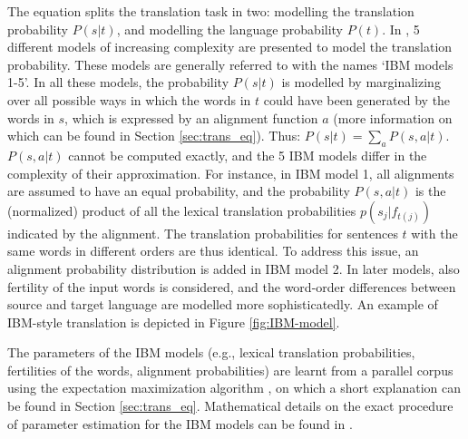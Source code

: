 The equation splits the translation task in two: modelling the translation probability $P(s|t)$, and modelling the language probability $P(t)$. In \cite{brown1993mathematics}, 5 different models of increasing complexity are presented to model the translation probability. These models are generally referred to with the names `IBM models 1-5'. In all these models, the probability $P(s|t)$ is modelled by marginalizing over all possible ways in which the words in $t$ could have been generated by the words in $s$, which is expressed by an alignment function $a$ (more information on which can be found in Section \ref{sec:trans_eq}). Thus: $P(s|t) = \sum_a P(s,a|t)$. $P(s,a|t)$ cannot be computed exactly, and the 5 IBM models differ in the complexity of their approximation. For instance, in IBM model 1, all alignments are assumed to have an equal probability, and the probability $P(s,a|t)$ is the (normalized) product of all the lexical translation probabilities $p(s_j|f_{t(j)})$ indicated by the alignment. The translation probabilities for sentences $t$ with the same words in different orders are thus identical. To address this issue, an alignment probability distribution is added in IBM model 2. In later models, also fertility of the input words is considered, and the word-order differences between source and target language are modelled more sophisticatedly. An example of IBM-style translation is depicted in Figure \ref{fig:IBM-model}.

The parameters of the IBM models (e.g., lexical translation probabilities, fertilities of the words, alignment probabilities) are learnt from a parallel corpus using the expectation maximization algorithm \citep{dempster1977maximum}, on which a short explanation can be found in Section \ref{sec:trans_eq}. Mathematical details on the exact procedure of parameter estimation for the IBM models can be found in \cite{brown1993mathematics}.


